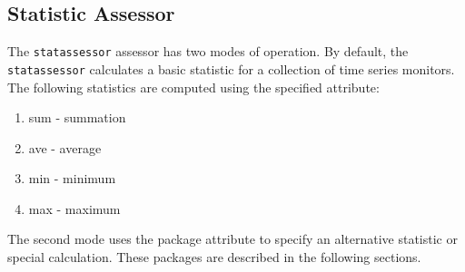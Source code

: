 \subsection{Statistic Assessor}

The {\tt statassessor} assessor has two modes of operation. By
default, the {\tt statassessor} calculates a basic statistic for a
collection of time series monitors.  The following statistics are
computed using the specified attribute:

\begin{enumerate}
 \item sum \-- summation
 \item ave \-- average
 \item min \-- minimum 
 \item max \-- maximum
\end{enumerate}

The second mode uses the package attribute to specify an alternative
statistic or special calculation. These packages are described in the
following sections.


